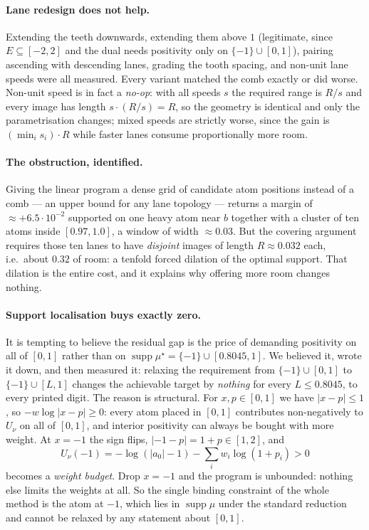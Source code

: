 \documentclass[11pt]{article}
\newcommand{\supp}{\operatorname{supp}}
\begin{document}
\paragraph{Lane redesign does not help.} Extending the teeth downwards,
extending them above $1$ (legitimate, since $E\subseteq[-2,2]$ and the
dual needs positivity only on $\{-1\}\cup[0,1]$), pairing ascending with
descending lanes, grading the tooth spacing, and non-unit lane speeds
were all measured. Every variant matched the comb exactly or did worse.
Non-unit speed is in fact a \emph{no-op}: with all speeds $s$ the
required range is $R/s$ and every image has length $s\cdot(R/s)=R$, so
the geometry is identical and only the parametrisation changes; mixed
speeds are strictly worse, since the gain is $(\min_i s_i)\cdot R$ while
faster lanes consume proportionally more room.

\paragraph{The obstruction, identified.} Giving the linear program a
dense grid of candidate atom positions instead of a comb --- an upper
bound for any lane topology --- returns a margin of $\approx+6.5
\cdot10^{-2}$ supported on one heavy atom near $b$ together with a
cluster of ten atoms inside $[0.97,1.0]$, a window of width $\approx
0.03$. But the covering argument requires those ten lanes to have
\emph{disjoint} images of length $R\approx0.032$ each, i.e.\ about
$0.32$ of room: a tenfold forced dilation of the optimal support. That
dilation is the entire cost, and it explains why offering more room
changes nothing.

\paragraph{Support localisation buys exactly zero.} It is tempting to
believe the residual gap is the price of demanding positivity on all of
$[0,1]$ rather than on $\supp\mu^\star=\{-1\}\cup[0.8045,1]$. We
believed it, wrote it down, and then measured it: relaxing the
requirement from $\{-1\}\cup[0,1]$ to $\{-1\}\cup[L,1]$ changes the
achievable target by \emph{nothing} for every $L\le0.8045$, to every
printed digit. The reason is structural. For $x,p\in[0,1]$ we have
$\lvert x-p\rvert\le1$, so $-w\log\lvert x-p\rvert\ge0$: every atom
placed in $[0,1]$ contributes non-negatively to $U_\nu$ on all of
$[0,1]$, and interior positivity can always be bought with more weight.
At $x=-1$ the sign flips, $\lvert-1-p\rvert=1+p\in[1,2]$, and
\[
  U_\nu(-1)=-\log(\lvert a_0\rvert-1)-\sum_i w_i\log(1+p_i)>0
\]
becomes a \emph{weight budget}. Drop $x=-1$ and the program is
unbounded: nothing else limits the weights at all. So the single binding
constraint of the whole method is the atom at $-1$, which lies in
$\supp\mu$ under the standard reduction and cannot be relaxed by any
statement about $[0,1]$.
\end{document}
